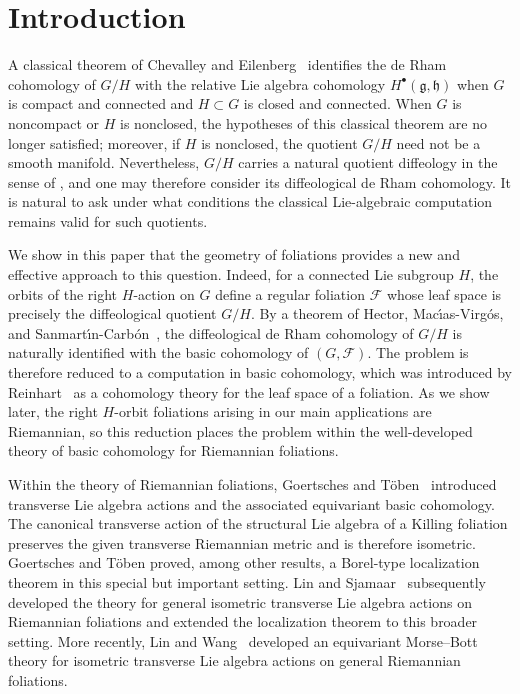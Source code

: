 \documentclass[reqno, 11pt]{amsart}
\theoremstyle{definition}
\theoremstyle{property}
\theoremstyle{remark}
\numberwithin{equation}{section}
\begin{document}
\maketitle

\section{Introduction}
A classical theorem of Chevalley and Eilenberg~\cite{CE48} identifies the de
Rham cohomology of $G/H$ with the relative Lie algebra cohomology
$H^\bullet(\mathfrak g,\mathfrak h)$ when $G$ is compact and connected and
$H\subset G$ is closed and connected. When $G$ is noncompact or $H$ is
nonclosed, the hypotheses of this classical theorem are no longer satisfied;
moreover, if $H$ is nonclosed, the quotient $G/H$ need not be a smooth
manifold. Nevertheless, $G/H$ carries a natural quotient diffeology in the
sense of \cite{I13}, and one may therefore consider its diffeological de Rham
cohomology. It is natural to ask under what conditions the classical
Lie-algebraic computation remains valid for such quotients.

We show in this paper that the geometry of foliations provides a new and
effective approach to this question. Indeed, for a connected Lie subgroup
$H$, the orbits of the right $H$-action on $G$ define a regular foliation
$\mathcal F$ whose leaf space is precisely the diffeological quotient $G/H$.
By a theorem of Hector, Mac\'{\i}as-Virg\'os, and
Sanmart\'{\i}n-Carb\'on~\cite[Theorem~3.5]{HMS}, the diffeological de Rham
cohomology of $G/H$ is naturally identified with the basic cohomology of
$(G,\mathcal F)$. The problem is therefore reduced to a computation in basic
cohomology, which was introduced by Reinhart~\cite{Re59} as a cohomology
theory for the leaf space of a foliation. As we show later, the right
$H$-orbit foliations arising in our main applications are Riemannian, so this
reduction places the problem within the well-developed theory of basic
cohomology for Riemannian foliations.

Within the theory of Riemannian foliations, Goertsches and
T\"oben~\cite{GT10} introduced transverse Lie algebra actions and the
associated equivariant basic cohomology. The canonical transverse action of
the structural Lie algebra of a Killing foliation preserves the given
transverse Riemannian metric and is therefore isometric. Goertsches and
T\"oben proved, among other results, a Borel-type localization theorem in this
special but important setting. Lin and Sjamaar~\cite{LS20} subsequently
developed the theory for general isometric transverse Lie algebra actions on
Riemannian foliations and extended the localization theorem to this broader
setting. More recently, Lin and Wang~\cite{LW24} developed an equivariant
Morse--Bott theory for isometric transverse Lie algebra actions on general
Riemannian foliations.
\end{document}
